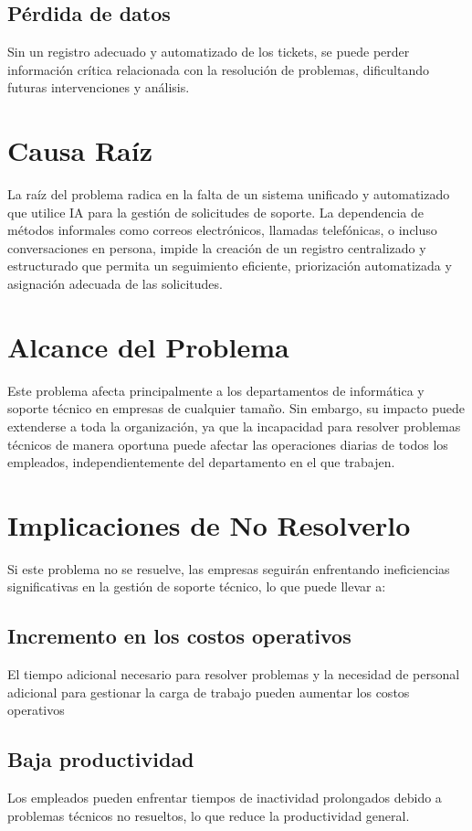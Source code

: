 \documentclass[a4paper,12pt]{article}
\begin{document}
\subsection{Pérdida de datos}
Sin un registro adecuado y automatizado de los tickets, se puede perder información crítica relacionada con la resolución de problemas, dificultando futuras intervenciones y análisis.


\section{Causa Raíz}
La raíz del problema radica en la falta de un sistema unificado y automatizado que utilice IA para la gestión de solicitudes de soporte. La dependencia de métodos informales como correos electrónicos, llamadas telefónicas, o incluso conversaciones en persona, impide la creación de un registro centralizado y estructurado que permita un seguimiento eficiente, priorización automatizada y asignación adecuada de las solicitudes.


\section{Alcance del Problema}
Este problema afecta principalmente a los departamentos de informática y soporte técnico en empresas de cualquier tamaño. Sin embargo, su impacto puede extenderse a toda la organización, ya que la incapacidad para resolver problemas técnicos de manera oportuna puede afectar las operaciones diarias de todos los empleados, independientemente del departamento en el que trabajen.

\section{Implicaciones de No Resolverlo}
Si este problema no se resuelve, las empresas seguirán enfrentando ineficiencias significativas en la gestión de soporte técnico, lo que puede llevar a:
\subsection{Incremento en los costos operativos}
El tiempo adicional necesario para resolver problemas y la necesidad de personal adicional para gestionar la carga de trabajo pueden aumentar los costos operativos

\subsection{Baja productividad}
Los empleados pueden enfrentar tiempos de inactividad prolongados debido a problemas técnicos no resueltos, lo que reduce la productividad general.
\end{document}
